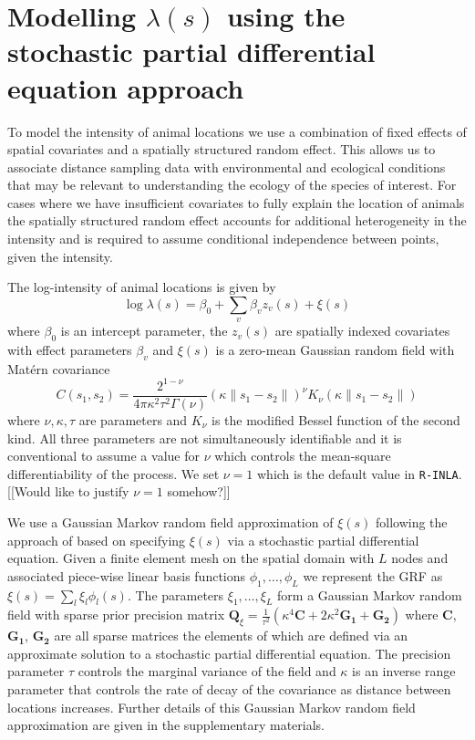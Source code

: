 \documentclass[preprint,12pt]{elsarticle}
\newcommand{\bm}{\boldsymbol}  %
\begin{document}
\section*{Modelling $\lambda(s)$ using the stochastic partial differential equation approach}

To model the intensity of animal locations we use a combination of fixed effects of spatial covariates and a spatially structured random effect.  This allows us to associate distance sampling data with environmental and ecological conditions that may be relevant to understanding the ecology of the species of interest.  For cases where we have insufficient covariates to fully explain the location of animals the spatially structured random effect accounts for additional heterogeneity in the intensity and is required to assume conditional independence between points, given the intensity.

The log-intensity of animal locations is given by
\begin{equation*}
\log \lambda(s) = \beta_0 + \sum_v \beta_v z_v(s) + \xi(s)
\end{equation*}
where $\beta_0$ is an intercept parameter, the $z_v(s)$ are spatially indexed covariates with effect parameters $\beta_v$ and $\xi(s)$ is a zero-mean Gaussian random field with Mat\'ern covariance
\begin{equation}
C(s_1,s_2) = \frac{2^{1-\nu}}{4\pi\kappa^2\tau^2\Gamma(\nu)}(\kappa \|s_1-s_2\|)^{\nu}K_\nu(\kappa \|s_1-s_2\|)
\end{equation}
where \(\nu, \kappa, \tau\) are parameters and \(K_{\nu}\) is the modified Bessel function of the second kind.  All three parameters are not simultaneously identifiable \citep{zhang_inconsistent_2004} and it is conventional to assume a value for $\nu$ which controls the mean-square differentiability of the process.  We set $\nu = 1$ which is the default value in \texttt{R-INLA}. [[Would like to justify $\nu = 1$ somehow?]]

We use a Gaussian Markov random field approximation of $\xi(s)$ following the approach of \cite{lindgren_explicit_2011} based on specifying $\xi(s)$ via a stochastic partial differential equation.  Given a finite element mesh on the spatial domain with $L$ nodes and associated piece-wise linear basis functions $\phi_1, \ldots, \phi_L$ we represent the GRF as $\xi(s) = \sum_l \xi_l \phi_l(s)$.  The parameters $\xi_1, \ldots, \xi_L$ form a Gaussian Markov random field with sparse prior precision matrix $\bm{Q}_{\xi} = \frac{1}{\tau^2}\left(\kappa^4\bm{C} + 2\kappa^2\bm{G_1} + \bm{G_2}\right)$ where $\bm{C}$, $\bm{G_1}$, $\bm{G_2}$ are all sparse matrices the elements of which are defined via an approximate solution to a stochastic partial differential equation. The precision parameter $\tau$ controls the marginal variance of the field and $\kappa$ is an inverse range parameter that controls the rate of decay of the covariance as distance between locations increases.  Further details of this Gaussian Markov random field approximation are given in the supplementary materials.
\end{document}
